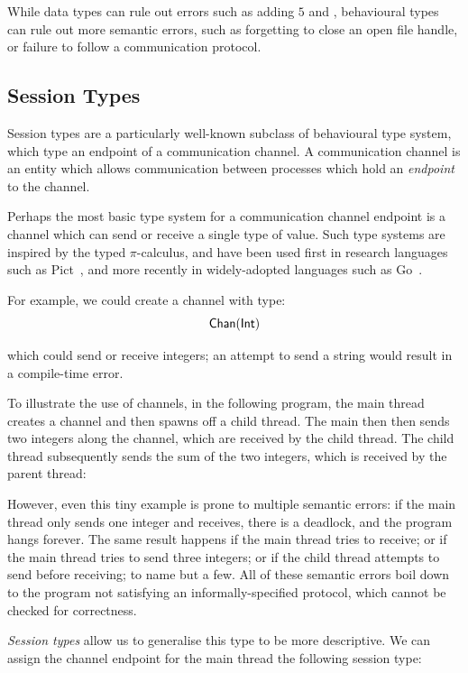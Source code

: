 \documentclass[
graybox,
envcountchap
]{svmult}
\begin{document}
\begin{bibunit}
  While data types can rule out errors such as adding $5$ and ,
  behavioural types can rule out more semantic errors, such as forgetting to
  close an open file handle, or failure to follow a communication protocol.


  \subsection{Session Types}
  Session types are a particularly well-known subclass of behavioural type
  system, which type an endpoint of a communication channel. A communication
  channel is an entity which allows communication between processes which hold
  an \emph{endpoint} to the channel.

  Perhaps the most basic type system for a communication channel endpoint is a
  channel which can send or receive a single type of value. Such type systems
  are inspired by the typed $\pi$-calculus, and have been used first in research
  languages such as Pict~\cite{PierceT00:pict}, and more recently in
  widely-adopted languages such as Go~\cite{DonovanK15:go}.

  For example, we could create a channel with type:
  \[
    \mathsf{Chan}(\mathsf{Int})
  \]


  which could send or receive integers; an attempt to send a string would result
  in a compile-time error.

  To illustrate the use of channels, in the following program, the
  main thread creates a channel and then spawns off a child thread. The main
  then then sends two integers along the channel, which are received by the
  child thread. The child thread subsequently sends the sum of the two integers,
  which is received by the parent thread:


  However, even this tiny example is prone to multiple semantic errors: if the
  main thread only sends one integer and receives, there is a deadlock, and the
  program hangs forever. The same result happens if the main thread tries to
  receive; or if the main thread tries to send three integers; or if the child
  thread attempts to send before receiving; to name but a few. All of these
  semantic errors boil down to the program not satisfying an
  informally-specified protocol, which cannot be checked for correctness.

  \emph{Session types} allow us to generalise this type to be more descriptive.
  We can assign the channel endpoint for the main thread the following session
  type:


\end{bibunit}
\end{document}
